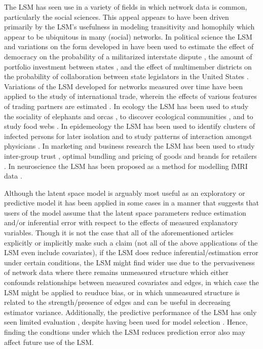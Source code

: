 \documentclass[12pt]{article}
\begin{document}
The LSM has seen use in a variety of fields in which network data is common, particularly the social sciences. This appeal appears to have been driven primarily by the LSM's usefulness in modeling transitivity and homophily which appear to be ubiquitous in many (social) networks. In political science the LSM and variations on the form developed in \cite{hoff2002latent} have been used to estimate the effect of democracy on the probability of a militarized interstate dispute \citep{ward2007disputes}, the amount of portfolio investment between states \citep{cao2013democracies}, and the effect of multimember districts on the probability of collaboration between state legislators in the United States \citep{kirkland2012multimember}. Variations of the LSM developed for networks measured over time have been applied to the study of international trade, wherein the effects of various features of trading partners are estimated \citep{ward2013gravity}. In ecology the LSM has been used to study the sociality of elephants \citep{vance2009social} and orcas \citep{fearnbach2014spatial}, to discover ecological communities \citep{fletcher2011social, fletcher2013network}, and to study food webs \citep{chiu2011unifying}. In epidemeology the LSM has been used to identify clusters of infected persons for later isolation \citep{zhang2015cluster} and to study patterns of interaction amongst physicians \citep{paul2014results}. In marketing and business research the LSM has been used to study inter-group trust \citep{dass2011impact}, optimal bundling and pricing of goods and brands for retailers \citep{dass2012assessing}. In neuroscience the LSM has been proposed as a method for modelling fMRI data \citep{simpson2013analyzing}.


Although the latent space model is arguably most useful as an exploratory or predictive model \citep{hoff2002latent, shmueli2010explain} it has been applied in some cases in a manner that suggests that users of the model assume that the latent space parameters reduce estimation and/or inferential error with respect to the effects of measured explanatory variables. Though it is not the case that all of the aforementioned articles explicitly or implicitly make such a claim (not all of the above applications of the LSM even include covariates), if the LSM does reduce inferential/estimation error under certain conditions, the LSM might find wider use due to the pervasiveness of network data where there remains unmeasured structure which either confounds relationships between measured covariates and edges, in which case the LSM might be applied to reuduce bias, or in which unmeasured structure is related to the strength/presence of edges and can be useful in decreasing estimator variance. Additionally, the predictive performance of the LSM has only seen limited evaluation \citep{hoff2002latent}, despite having been used for model selection \citep{ward2013gravity, fletcher2011social, fletcher2013network, chiu2011unifying}. Hence, finding the condtions under which the LSM reduces prediction error also may affect future use of the LSM.
\end{document}
